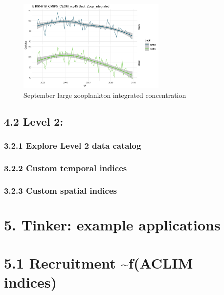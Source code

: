 \documentclass[
]{article}
\begin{document}
\begin{figure}
\centering
\includegraphics[width=0.65\textwidth,height=\textheight]{Figs/Sept_large_Zoop.jpg}
\caption{September large zooplankton integrated concentration}
\end{figure}

\hypertarget{level-2}{%
\subsection{4.2 Level 2:}\label{level-2}}

\hypertarget{explore-level-2-data-catalog}{%
\subsubsection{3.2.1 Explore Level 2 data
catalog}\label{explore-level-2-data-catalog}}

\hypertarget{custom-temporal-indices}{%
\subsubsection{3.2.2 Custom temporal
indices}\label{custom-temporal-indices}}

\hypertarget{custom-spatial-indices}{%
\subsubsection{3.2.3 Custom spatial
indices}\label{custom-spatial-indices}}

\hypertarget{tinker-example-applications}{%
\section{5. Tinker: example
applications}\label{tinker-example-applications}}

\hypertarget{recruitment-faclim-indices}{%
\section{5.1 Recruitment \textasciitilde f(ACLIM
indices)}\label{recruitment-faclim-indices}}
\end{document}
